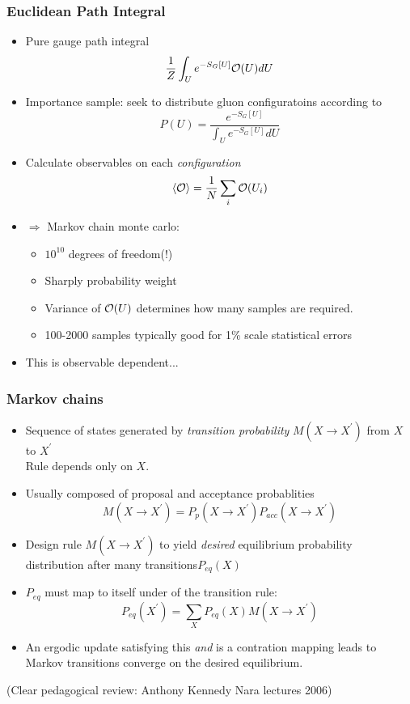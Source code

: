\documentclass[pdf,ps,8pt]{beamer}
\begin{document}
\begin{frame}[fragile]\small\frametitle{Euclidean Path Integral}
\begin{itemize}
\item Pure gauge path integral
  $$
  \frac{1}{Z} \int_U e^{-S_G[U]} {\cal O}(U) dU 
  $$
\item Importance sample: seek to distribute gluon configuratoins according to
  $$
  P(U) = \frac{e^{-S_G[U]}}{\int_U e^{-S_G[U]} dU}
  $$
\item Calculate observables on each \emph{configuration}
  $$
\langle {\cal O} \rangle = \frac{1}{N} \sum\limits_i {\cal O}(U_i) 
$$
\item $\Rightarrow$ Markov chain monte carlo:
\begin{itemize}
\item $10^{10}$ degrees of freedom(!)
\item Sharply probability weight
\item Variance of ${\cal O}(U)$ determines how many samples are required.
\item 100-2000 samples typically good for 1\% scale statistical errors
\end{itemize}
\item This is observable dependent...  
\end{itemize}
\end{frame}


\begin{frame}[fragile]\small\frametitle{Markov chains}
  \begin{itemize}
\item Sequence of states generated by \emph{transition probability} $M(X\to X^\prime)$ from $X$ to $X^\prime$\\
      Rule depends only on $X$.
\item Usually composed of proposal and acceptance probablities
$$
M(X\to X^\prime) = P_p(X\to X^\prime) P_{acc}(X\to X^\prime)
$$
\item Design rule $M(X\to X^\prime)$ to yield \emph{desired} equilibrium probability distribution after many transitions$P_{eq}(X)$
\item $P_{eq}$ must map to itself under of the transition rule:
$$
P_{eq}(X^\prime) = \sum\limits_X P_{eq}(X) M(X \to X^\prime) 
$$
\item An ergodic update satisfying this \emph{and} is a contration mapping leads to
      Markov transitions converge on the desired equilibrium.
  \end{itemize}
(Clear pedagogical review: Anthony Kennedy Nara lectures 2006)
\end{frame}
\end{document}
